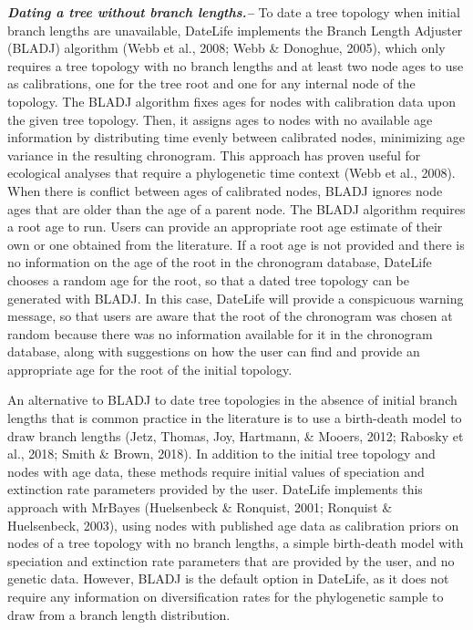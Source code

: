 \documentclass[english,man]{apa6}
\begin{document}
\textbf{\emph{Dating a tree without branch lengths.--}}
To date a tree topology when initial branch lengths are unavailable, DateLife implements the Branch Length Adjuster (BLADJ) algorithm (Webb et al., 2008; Webb \& Donoghue, 2005), which only requires a tree topology with no branch lengths and at least two node ages to use as calibrations, one for the tree root and one for any internal node of the topology.
The BLADJ algorithm fixes ages for nodes with calibration data upon the given tree topology. Then, it assigns ages to nodes with no available age information by distributing time evenly between calibrated nodes, minimizing age variance in the resulting chronogram.
This approach has proven useful for ecological analyses that require a phylogenetic time context (Webb et al., 2008).
When there is conflict between ages of calibrated nodes, BLADJ ignores node ages that are older than the age of a parent node.
The BLADJ algorithm requires a root age to run. Users can provide an appropriate root age estimate of their own or one obtained from the literature. If a root age is not provided and there is no information on the age of the root in the chronogram database, DateLife chooses a random age for the root, so that a dated tree topology can be generated with BLADJ. In this case, DateLife will provide a conspicuous warning message, so that users are aware that the root of the chronogram was chosen at random because there was no information available for it in the chronogram database, along with suggestions on how the user can find and provide an appropriate age for the root of the initial topology.

An alternative to BLADJ to date tree topologies in the absence of initial branch lengths that is common practice in the literature is to use a birth-death model to draw branch lengths (Jetz, Thomas, Joy, Hartmann, \& Mooers, 2012; Rabosky et al., 2018; Smith \& Brown, 2018). In addition to the initial tree topology and nodes with age data, these methods require initial values of speciation and extinction rate parameters provided by the user. DateLife implements this approach with MrBayes (Huelsenbeck \& Ronquist, 2001; Ronquist \& Huelsenbeck, 2003), using nodes with published age data as calibration priors on nodes of a tree topology with no branch lengths, a simple birth-death model with speciation and extinction rate parameters that are provided by the user, and no genetic data. However, BLADJ is the default option in DateLife, as it does not require any information on diversification rates for the phylogenetic sample to draw from a branch length distribution.
\end{document}
